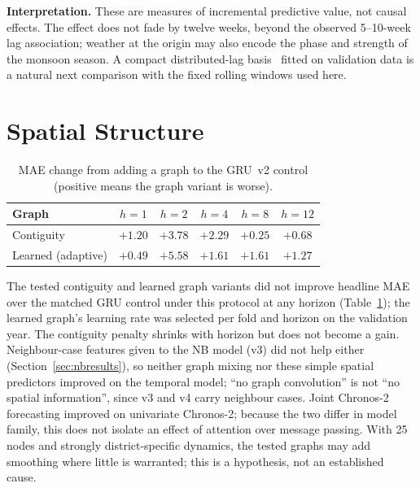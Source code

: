 \textbf{Interpretation.} These are measures of incremental predictive value, not causal effects. The effect does not fade by twelve weeks, beyond the observed 5--10-week lag association; weather at the origin may also encode the phase and strength of the monsoon season. A compact distributed-lag basis~\cite{gasparrini2010dlnm,lowe2018barbados} fitted on validation data is a natural next comparison with the fixed rolling windows used here.

\section{Spatial Structure}
\label{sec:spatial}

\begin{table}[t]
\centering
\caption{MAE change from adding a graph to the GRU~v2 control (positive means the graph variant is worse).}
\label{tab:graphs}
\begin{tabular}{lccccc}
\toprule
\textbf{Graph} & $h=1$ & $h=2$ & $h=4$ & $h=8$ & $h=12$ \\
\midrule
Contiguity & $+1.20$ & $+3.78$ & $+2.29$ & $+0.25$ & $+0.68$ \\
Learned (adaptive) & $+0.49$ & $+5.58$ & $+1.61$ & $+1.61$ & $+1.27$ \\
\bottomrule
\end{tabular}
\end{table}

The tested contiguity and learned graph variants did not improve headline MAE over the matched GRU control under this protocol at any horizon (Table~\ref{tab:graphs}); the learned graph's learning rate was selected per fold and horizon on the validation year. The contiguity penalty shrinks with horizon but does not become a gain. Neighbour-case features given to the NB model (v3) did not help either (Section~\ref{sec:nbresults}), so neither graph mixing nor these simple spatial predictors improved on the temporal model; ``no graph convolution'' is not ``no spatial information'', since v3 and v4 carry neighbour cases. Joint Chronos-2 forecasting improved on univariate Chronos-2; because the two differ in model family, this does not isolate an effect of attention over message passing. With 25 nodes and strongly district-specific dynamics, the tested graphs may add smoothing where little is warranted; this is a hypothesis, not an established cause.

